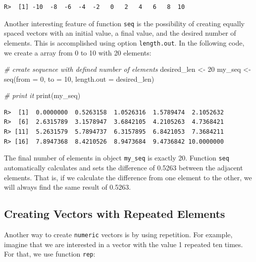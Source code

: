 \documentclass[
  12pt,
]{book}
\newenvironment{Shaded}{\begin{snugshade}}{\end{snugshade}}
\newcommand{\AttributeTok}[1]{\textcolor[rgb]{0.61,0.61,0.61}{#1}}
\newcommand{\CommentTok}[1]{\textcolor[rgb]{0.37,0.37,0.37}{\textit{#1}}}
\newcommand{\DecValTok}[1]{\textcolor[rgb]{0.06,0.06,0.06}{#1}}
\newcommand{\FunctionTok}[1]{\textcolor[rgb]{0,0,0}{#1}}
\newcommand{\NormalTok}[1]{#1}
\newcommand{\OtherTok}[1]{\textcolor[rgb]{0.37,0.37,0.37}{#1}}
\begin{document}
\begin{verbatim}
R>  [1] -10  -8  -6  -4  -2   0   2   4   6   8  10
\end{verbatim}

Another interesting feature of function \texttt{seq} is the possibility of creating equally spaced vectors with an initial value, a final value, and the desired number of elements. This is accomplished using option \texttt{length.out}. In the following code, we create a array from 0 to 10 with 20 elements:

\begin{Shaded}
\begin{Highlighting}[]
\CommentTok{\# create sequence with defined number of elements}
\NormalTok{desired\_len }\OtherTok{\textless{}{-}} \DecValTok{20}
\NormalTok{my\_seq }\OtherTok{\textless{}{-}} \FunctionTok{seq}\NormalTok{(}\AttributeTok{from =} \DecValTok{0}\NormalTok{, }
              \AttributeTok{to =} \DecValTok{10}\NormalTok{, }
              \AttributeTok{length.out =}\NormalTok{ desired\_len)}

\CommentTok{\# print it}
\FunctionTok{print}\NormalTok{(my\_seq)}
\end{Highlighting}
\end{Shaded}

\begin{verbatim}
R>  [1]  0.0000000  0.5263158  1.0526316  1.5789474  2.1052632
R>  [6]  2.6315789  3.1578947  3.6842105  4.2105263  4.7368421
R> [11]  5.2631579  5.7894737  6.3157895  6.8421053  7.3684211
R> [16]  7.8947368  8.4210526  8.9473684  9.4736842 10.0000000
\end{verbatim}

The final number of elements in object \texttt{my\_seq} is exactly 20. Function \texttt{seq} automatically calculates and sets the difference of 0.5263 between the adjacent elements. That is, if we calculate the difference from one element to the other, we will always find the same result of 0.5263.

\hypertarget{creating-vectors-with-repeated-elements}{%
\subsection{Creating Vectors with Repeated Elements}\label{creating-vectors-with-repeated-elements}}

Another way to create \texttt{numeric} vectors is by using repetition. For example, imagine that we are interested in a vector with the value 1 repeated ten times. For that, we use function \texttt{rep}: 
\end{document}
